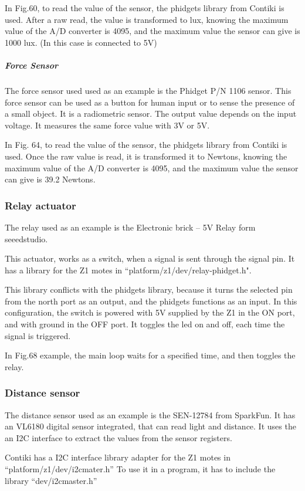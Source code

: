 In Fig.60,
	to read the value of the sensor,
	the phidgets library from Contiki is used.
After a raw read,
	the value is transformed to lux,
	knowing the maximum value of the A/D converter is 4095,
	and the maximum value the sensor can give is 1000 lux.
(In this case is connected to 5V) 


\subparagraph{Force Sensor}

The force sensor used used as an example is the Phidget P/N 1106 sensor.
This force sensor can be used as a button for human input or to sense the presence of a small object.
It is a radiometric sensor.
The output value depends on the input voltage.
It measures the same force value with 3V or 5V.

In Fig. 64,
	to read the value of the sensor,
	the phidgets library from Contiki is used.
Once the raw value is read,
	it is transformed it to Newtons,
	knowing the maximum value of the A/D converter is 4095,
	and the maximum value the sensor can give is 39.2 Newtons.

\subsubsection{Relay actuator}
The relay used as an example is the Electronic brick – 5V Relay form seeedstudio.

This actuator,
	works as a switch,
	when a signal is sent through the signal pin.
It has a library for the Z1 motes in “platform/z1/dev/relay-phidget.h".

This library conflicts with the phidgets library,
	because it turns the selected pin from the north port as an output,
	and the phidgets functions as an input.
In this configuration,
	the switch is powered with 5V supplied by the Z1 in the ON port,
	and with ground in the OFF port.
It toggles the led on and off,
	each time the signal is triggered.

In Fig.68 example,
	the main loop waits for a specified time,
	and then toggles the relay.

\subsubsection{Distance sensor}
The distance sensor used as an example is the SEN-12784 from SparkFun.
It has an VL6180 digital sensor integrated,
	that can read light and distance.
It uses the an I2C interface to extract the values from the sensor registers.

Contiki has a I2C interface library adapter for the Z1 motes in “platform/z1/dev/i2cmater.h” To use it in a program,
	it has to include the library “dev/i2cmaster.h”

